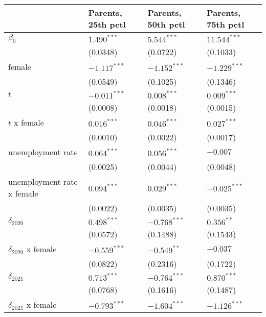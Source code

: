 \begin{tabular}{llll}
\toprule
{} & Parents, 25th pctl & Parents, 50th pctl & Parents, 75th pctl \\
\midrule
$\beta_0$                  &      $1.490^{***}$ &      $5.544^{***}$ &     $11.544^{***}$ \\
                           &           (0.0348) &           (0.0722) &           (0.1033) \\
female                     &     $-1.117^{***}$ &     $-1.152^{***}$ &     $-1.229^{***}$ \\
                           &           (0.0549) &           (0.1025) &           (0.1346) \\
$t$                        &     $-0.011^{***}$ &      $0.008^{***}$ &      $0.009^{***}$ \\
                           &           (0.0008) &           (0.0018) &           (0.0015) \\
$t$ x female               &      $0.016^{***}$ &      $0.046^{***}$ &      $0.027^{***}$ \\
                           &           (0.0010) &           (0.0022) &           (0.0017) \\
unemployment rate          &      $0.064^{***}$ &      $0.056^{***}$ &           $-0.007$ \\
                           &           (0.0025) &           (0.0044) &           (0.0048) \\
unemployment rate x female &      $0.094^{***}$ &      $0.029^{***}$ &     $-0.025^{***}$ \\
                           &           (0.0022) &           (0.0035) &           (0.0035) \\
$\delta_{2020}$            &      $0.498^{***}$ &     $-0.768^{***}$ &       $0.356^{**}$ \\
                           &           (0.0572) &           (0.1488) &           (0.1543) \\
$\delta_{2020}$ x female   &     $-0.559^{***}$ &      $-0.549^{**}$ &           $-0.037$ \\
                           &           (0.0822) &           (0.2316) &           (0.1722) \\
$\delta_{2021}$            &      $0.713^{***}$ &     $-0.764^{***}$ &      $0.870^{***}$ \\
                           &           (0.0768) &           (0.1616) &           (0.1487) \\
$\delta_{2021}$ x female   &     $-0.793^{***}$ &     $-1.604^{***}$ &     $-1.126^{***}$ \\

\end{tabular}
